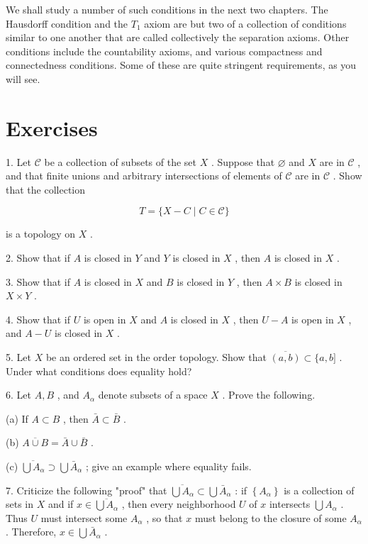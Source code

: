 \documentclass[10pt]{article}
\begin{document}
We shall study a number of such conditions in the next two chapters. The Hausdorff condition and the \({T}_{1}\) axiom are but two of a collection of conditions similar to one another that are called collectively the separation axioms. Other conditions include the countability axioms, and various compactness and connectedness conditions. Some of these are quite stringent requirements, as you will see.

\section*{Exercises}

1. Let \(\mathcal{C}\) be a collection of subsets of the set \(X\) . Suppose that \(\varnothing\) and \(X\) are in \(\mathcal{C}\) , and that finite unions and arbitrary intersections of elements of \(\mathcal{C}\) are in \(\mathcal{C}\) . Show that the collection

\[
T = \{ X - C \mid  C \in  \mathcal{C}\}
\]

is a topology on \(X\) .

2. Show that if \(A\) is closed in \(Y\) and \(Y\) is closed in \(X\) , then \(A\) is closed in \(X\) .

3. Show that if \(A\) is closed in \(X\) and \(B\) is closed in \(Y\) , then \(A \times  B\) is closed in \(X \times  Y\) .

4. Show that if \(U\) is open in \(X\) and \(A\) is closed in \(X\) , then \(U - A\) is open in \(X\) , and \(A - U\) is closed in \(X\) .

5. Let \(X\) be an ordered set in the order topology. Show that \(\overline{\left( a,b\right) } \subset  \{ a,b\rbrack\) . Under what conditions does equality hold?

6. Let \(A,B\) , and \({A}_{\alpha }\) denote subsets of a space \(X\) . Prove the following.

(a) If \(A \subset  B\) , then \(\bar{A} \subset  \bar{B}\) .

(b) \(\overline{A \cup  B} = \bar{A} \cup  \bar{B}\) .

(c) \(\overline{\bigcup {A}_{\alpha }} \supset  \bigcup {\bar{A}}_{\alpha }\) ; give an example where equality fails.

7. Criticize the following "proof" that \(\overline{\bigcup {A}_{\alpha }} \subset  \bigcup {\bar{A}}_{\alpha }\) : if \(\left\{  {A}_{\alpha }\right\}\) is a collection of sets in \(X\) and if \(x \in  \overline{\bigcup {A}_{\alpha }}\) , then every neighborhood \(U\) of \(x\) intersects \(\bigcup {A}_{\alpha }\) . Thus \(U\) must intersect some \({A}_{\alpha }\) , so that \(x\) must belong to the closure of some \({A}_{\alpha }\) . Therefore, \(x \in  \bigcup {\bar{A}}_{\alpha }\) .
\end{document}
